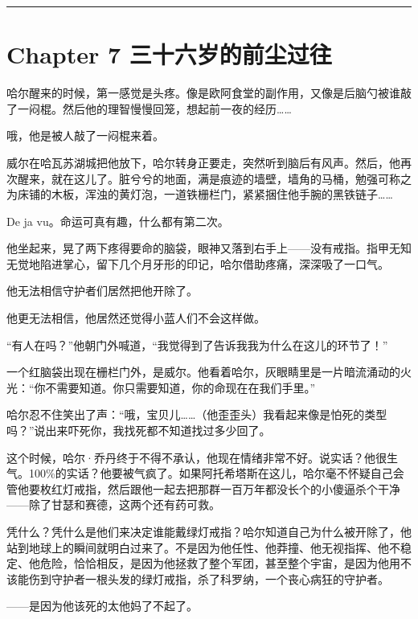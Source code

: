 \documentclass[../main]{subfiles}
\begin{document}
\begin{center}\rule{0.5\linewidth}{0.5pt}\end{center}

\hypertarget{chapter-7-ux4e09ux5341ux516dux5c81ux7684ux524dux5c18ux8fc7ux5f80}{%
    \section{Chapter 7
      三十六岁的前尘过往}\label{chapter-7-ux4e09ux5341ux516dux5c81ux7684ux524dux5c18ux8fc7ux5f80}}

哈尔醒来的时候，第一感觉是头疼。像是欧阿食堂的副作用，又像是后脑勺被谁敲了一闷棍。然后他的理智慢慢回笼，想起前一夜的经历……

哦，他是被人敲了一闷棍来着。

威尔在哈瓦苏湖城把他放下，哈尔转身正要走，突然听到脑后有风声。然后，他再次醒来，就在这儿了。脏兮兮的地面，满是痕迹的墙壁，墙角的马桶，勉强可称之为床铺的木板，浑浊的黄灯泡，一道铁栅栏门，紧紧捆住他手腕的黑铁链子……

De ja vu。命运可真有趣，什么都有第二次。

他坐起来，晃了两下疼得要命的脑袋，眼神又落到右手上——没有戒指。指甲无知无觉地陷进掌心，留下几个月牙形的印记，哈尔借助疼痛，深深吸了一口气。

他无法相信守护者们居然把他开除了。

他更无法相信，他居然还觉得小蓝人们不会这样做。

“有人在吗？”他朝门外喊道，“我觉得到了告诉我我为什么在这儿的环节了！”

一个红脑袋出现在栅栏门外，是威尔。他看着哈尔，灰眼睛里是一片暗流涌动的火光：“你不需要知道。你只需要知道，你的命现在在我们手里。”

哈尔忍不住笑出了声：“哦，宝贝儿\ldots\ldots（他歪歪头）我看起来像是怕死的类型吗？”说出来吓死你，我找死都不知道找过多少回了。

这个时候，哈尔·乔丹终于不得不承认，他现在情绪非常不好。说实话？他很生气。100\%的实话？他要被气疯了。如果阿托希塔斯在这儿，哈尔毫不怀疑自己会管他要枚红灯戒指，然后跟他一起去把那群一百万年都没长个的小傻逼杀个干净——除了甘瑟和赛德，这两个还有药可救。

凭什么？凭什么是他们来决定谁能戴绿灯戒指？哈尔知道自己为什么被开除了，他站到地球上的瞬间就明白过来了。不是因为他任性、他莽撞、他无视指挥、他不稳定、他危险，恰恰相反，是因为他拯救了整个军团，甚至整个宇宙，是因为他用不该能伤到守护者一根头发的绿灯戒指，杀了科罗纳，一个丧心病狂的守护者。

——是因为他该死的太他妈了不起了。
\end{document}
